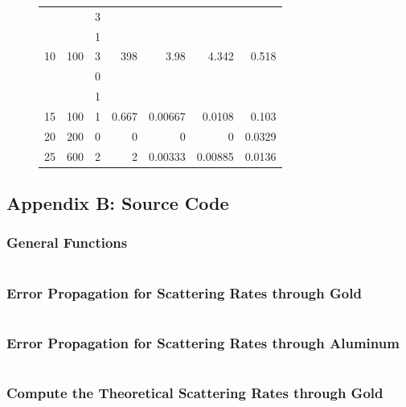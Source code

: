 \documentclass[a4paper]{article}
\begin{document}
\begin{figure}[H]
\begin{center}
\begin{adjustwidth}{-3.75cm}{}
\begin{tabular}{|r|r|r|r|r|r|r|}
        & & 3 & & & & \\
        & & 1 & & & & \\
        10 & 100 & 3 & 398 & 3.98 & 4.342 & \num{0.518} \\
        \hline
        & & 0 & & & & \\
        & & 1 & & & & \\
        15 & 100 & 1 & 0.667 & \num{0.00667} & \num{0.0108} & \num{0.103} \\
        \hline
        20 & 200 & 0 & 0 & 0 & 0 & \num{0.0329} \\
        \hline
        25 & 600 & 2 & 2 & \num{0.00333} & \num{0.00885} & \num{0.0136} \\
        \hline
      \end{tabular}
    \end{adjustwidth}
  \end{center}
  \label{tab:scatRatesAl}
\end{figure}

\subsection{Appendix B: Source Code}

\subsubsection{General Functions}
\label{cod:genFuncs}
\inputminted{julia}{Code/genFuncs.jl}

\subsubsection{Error Propagation for Scattering Rates through Gold}
\label{cod:uncertScatRateGold}
\inputminted{julia}{Code/getUncertScatRate.jl}

\subsubsection{Error Propagation for Scattering Rates through Aluminum}
\label{cod:uncertScatRateAl}
\inputminted{julia}{Code/getUncertScatRateAl.jl}

\subsubsection{Compute the Theoretical Scattering Rates through Gold}
\label{cod:theoScatRateGold}
\inputminted{julia}{Code/getTheoScatRatesGold.jl}
\end{document}
